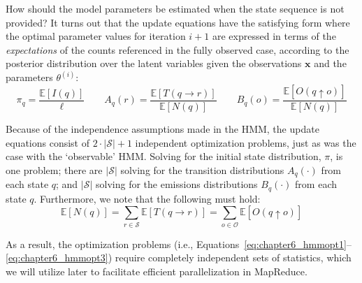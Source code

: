 How should the model parameters be estimated when the state sequence
is not provided?  It turns out that the update equations have the
satisfying form where the optimal parameter values for iteration $i+1$
are expressed in terms of the \emph{expectations} of the counts
referenced in the fully observed case, according to the posterior
distribution over the latent variables given the observations
$\textbf{x}$ and the parameters $\theta^{(i)}$:
\begin{equation}
\pi_q = \frac{\mathbb{E}[I(q)]}{\ell} \quad \quad A_q(r) = \frac{\mathbb{E}[T(q \rightarrow r)]}{\mathbb{E}[N(q)]} \quad \quad B_q(o) = \frac{\mathbb{E}[O(q \uparrow o)]}{\mathbb{E}[N(q)]}
\label{chapter6_hmm_update}
\end{equation}

\noindent Because of the independence assumptions made in the HMM, the
update equations consist of $2\cdot |\mathcal{S}| + 1$ independent
optimization problems, just as was the case with the `observable' HMM.
Solving for the initial state distribution, $\pi$, is one problem;
there are $|\mathcal{S}|$ solving for the transition distributions
$A_q(\cdot)$ from each state $q$; and $|\mathcal{S}|$ solving for the
emissions distributions $B_q(\cdot)$ from each state $q$.
Furthermore, we note that the following must hold:
\begin{equation}
\mathbb{E}[N(q)] = \sum_{r \in \mathcal{S}} \mathbb{E}[T(q \rightarrow r)] = \sum_{o \in \mathcal{O}} \mathbb{E}[O(q \uparrow o)]
\end{equation}

\noindent As a result, the optimization problems (i.e.,
Equations~\ref{eq:chapter6_hmmopt1}--\ref{eq:chapter6_hmmopt3}) require completely independent
sets of statistics, which we will utilize later to facilitate
efficient parallelization in MapReduce.

